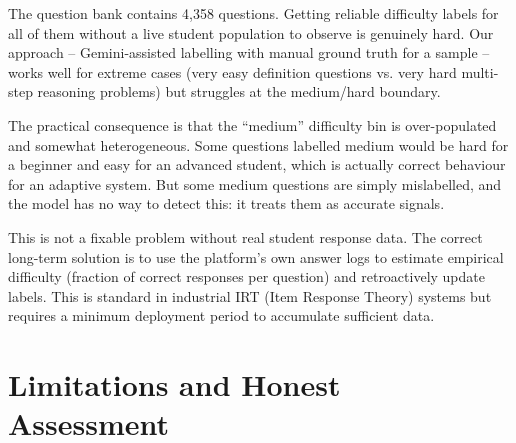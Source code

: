 \documentclass[12pt,a4paper]{article}
\begin{document}
The question bank contains 4,358 questions. Getting reliable difficulty labels for
all of them without a live student population to observe is genuinely hard. Our
approach -- Gemini-assisted labelling with manual ground truth for a sample -- works
well for extreme cases (very easy definition questions vs. very hard multi-step
reasoning problems) but struggles at the medium/hard boundary.

The practical consequence is that the ``medium'' difficulty bin is over-populated and
somewhat heterogeneous. Some questions labelled medium would be hard for a beginner and
easy for an advanced student, which is actually correct behaviour for an adaptive
system. But some medium questions are simply mislabelled, and the model has no way to
detect this: it treats them as accurate signals.

This is not a fixable problem without real student response data. The correct long-term
solution is to use the platform's own answer logs to estimate empirical difficulty
(fraction of correct responses per question) and retroactively update labels. This
is standard in industrial IRT (Item Response Theory) systems but requires a minimum
deployment period to accumulate sufficient data.

\section{Limitations and Honest Assessment}
\label{sec:limitations}
\end{document}
